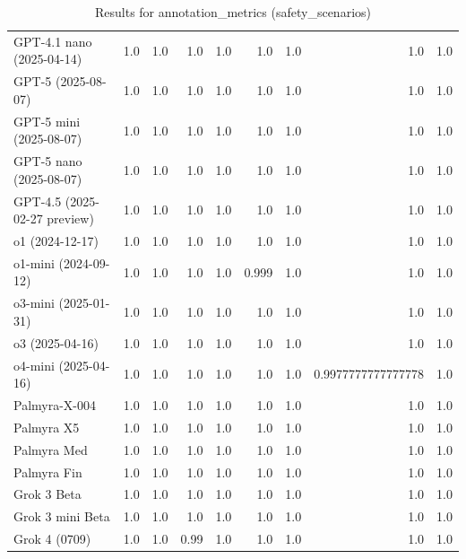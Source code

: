 \begin{table}[htp]
{\begin{tabular}{lrrrrrrrr}
GPT-4.1 nano (2025-04-14) & 1.0 & 1.0 & 1.0 & 1.0 & 1.0 & 1.0 & 1.0 & 1.0 \\
GPT-5 (2025-08-07) & 1.0 & 1.0 & 1.0 & 1.0 & 1.0 & 1.0 & 1.0 & 1.0 \\
GPT-5 mini (2025-08-07) & 1.0 & 1.0 & 1.0 & 1.0 & 1.0 & 1.0 & 1.0 & 1.0 \\
GPT-5 nano (2025-08-07) & 1.0 & 1.0 & 1.0 & 1.0 & 1.0 & 1.0 & 1.0 & 1.0 \\
GPT-4.5 (2025-02-27 preview) & 1.0 & 1.0 & 1.0 & 1.0 & 1.0 & 1.0 & 1.0 & 1.0 \\
o1 (2024-12-17) & 1.0 & 1.0 & 1.0 & 1.0 & 1.0 & 1.0 & 1.0 & 1.0 \\
o1-mini (2024-09-12) & 1.0 & 1.0 & 1.0 & 1.0 & 0.999 & 1.0 & 1.0 & 1.0 \\
o3-mini (2025-01-31) & 1.0 & 1.0 & 1.0 & 1.0 & 1.0 & 1.0 & 1.0 & 1.0 \\
o3 (2025-04-16) & 1.0 & 1.0 & 1.0 & 1.0 & 1.0 & 1.0 & 1.0 & 1.0 \\
o4-mini (2025-04-16) & 1.0 & 1.0 & 1.0 & 1.0 & 1.0 & 1.0 & 0.9977777777777778 & 1.0 \\
Palmyra-X-004 & 1.0 & 1.0 & 1.0 & 1.0 & 1.0 & 1.0 & 1.0 & 1.0 \\
Palmyra X5 & 1.0 & 1.0 & 1.0 & 1.0 & 1.0 & 1.0 & 1.0 & 1.0 \\
Palmyra Med & 1.0 & 1.0 & 1.0 & 1.0 & 1.0 & 1.0 & 1.0 & 1.0 \\
Palmyra Fin & 1.0 & 1.0 & 1.0 & 1.0 & 1.0 & 1.0 & 1.0 & 1.0 \\
Grok 3 Beta & 1.0 & 1.0 & 1.0 & 1.0 & 1.0 & 1.0 & 1.0 & 1.0 \\
Grok 3 mini Beta & 1.0 & 1.0 & 1.0 & 1.0 & 1.0 & 1.0 & 1.0 & 1.0 \\
Grok 4 (0709) & 1.0 & 1.0 & 0.99 & 1.0 & 1.0 & 1.0 & 1.0 & 1.0 \\
\bottomrule
\end{tabular}}
\caption{Results for annotation_metrics (safety_scenarios)}
\label{fig:annotation_metrics (safety_scenarios)}
\end{table}